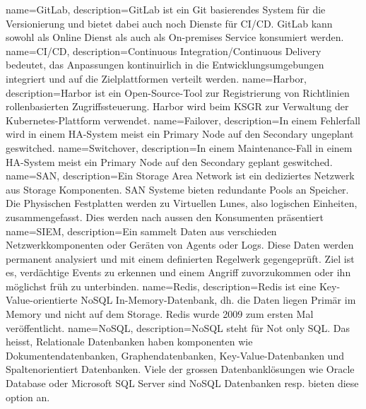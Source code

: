 {
        name=GitLab,
        description={GitLab ist ein \Gls{Git} basierendes System für die Versionierung und bietet dabei auch noch Dienste für CI/CD.
        GitLab kann sowohl als Online Dienst als auch als On-premises Service konsumiert werden\cite{MPSC6ELK}.}
}
{
        name=CI/CD,
        description={Continuous Integration/Continuous Delivery bedeutet,
        das Anpassungen kontinuirlich in die Entwicklungsumgebungen integriert und
        auf die Zielplattformen verteilt werden\cite{I65F7WAQ}.}
}
{
        name=Harbor,
        description={Harbor ist ein Open-Source-Tool zur Registrierung von Richtlinien rollenbasierten Zugriffssteuerung\cite{PV6GD72X}.
Harbor wird beim KSGR zur Verwaltung der \Gls{Kubernetes}-Plattform verwendet.}
}
{
        name=Failover,
        description={In einem Fehlerfall wird in einem HA-System meist ein Primary Node auf den Secondary ungeplant geswitched.}
}
{
        name=Switchover,
        description={In einem Maintenance-Fall in einem HA-System meist ein Primary Node auf den Secondary geplant geswitched.}
}
{
        name=SAN,
        description={Ein Storage Area Network ist ein dediziertes Netzwerk aus Storage Komponenten.
        SAN Systeme bieten redundante Pools an Speicher.
        Die Physischen Festplatten werden zu Virtuellen Lunes, also logischen Einheiten, zusammengefasst.
        Dies werden nach aussen den Konsumenten präsentiert\cite{ZRRXBFRA,7ZTCYW5G,JWVC9B7L}}
}
{
        name=SIEM,
        description={Ein sammelt Daten aus verschieden Netzwerkkomponenten oder Geräten von Agents oder Logs.
        Diese Daten werden permanent analysiert und mit einem definierten Regelwerk gegengeprüft.
        Ziel ist es, verdächtige Events zu erkennen und einem Angriff zuvorzukommen oder ihn möglichst früh zu unterbinden\cite{78JPTB5R}.}
}
{
        name=Redis,
        description={Redis ist eine \Gls{Key-Value-orientierte} \Gls{NoSQL} In-Memory-Datenbank, dh.
        die Daten liegen Primär im Memory und nicht auf dem Storage\cite{57XLMIRR}.
Redis wurde 2009 zum ersten Mal veröffentlicht.}
}
{
        name=NoSQL,
        description={NoSQL steht für Not only SQL. Das heisst, Relationale Datenbanken haben komponenten wie Dokumentendatenbanken,
Graphendatenbanken, \Gls{Key-Value-Datenbank}en und Spaltenorientiert Datenbanken.
Viele der grossen Datenbanklösungen wie \Gls{Oracle Database} oder \Gls{Microsoft SQL Server} sind NoSQL Datenbanken resp.
bieten diese option an.}
}

